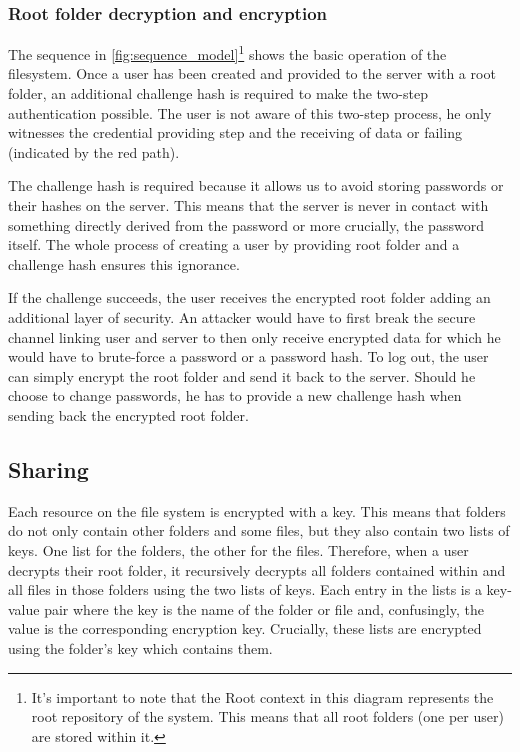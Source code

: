 \subsubsection{Root folder decryption and encryption}
The sequence in \autoref{fig:sequence_model}\footnote{It's important to note that the Root context in this diagram represents the root repository of the system. This means that all root folders (one per user) are stored within it.} shows the basic operation of the filesystem. Once a user has been created and provided to the server with a root folder, an additional challenge hash is required to make the two-step authentication possible. The user is not aware of this two-step process, he only witnesses the credential providing step and the receiving of data or failing (indicated by the red path).

The challenge hash is required because it allows us to avoid storing passwords or their hashes on the server. This means that the server is never in contact with something directly derived from the password or more crucially, the password itself. The whole process of creating a user by providing root folder and a challenge hash ensures this ignorance.

If the challenge succeeds, the user receives the encrypted root folder adding an additional layer of security. An attacker would have to first break the secure channel linking user and server to then only receive encrypted data for which he would have to brute-force a password or a password hash. To log out, the user can simply encrypt the root folder and send it back to the server. Should he choose to change passwords, he has to provide a new challenge hash when sending back the encrypted root folder. 

\subsection{Sharing}
Each resource on the file system is encrypted with a key. This means that folders do not only contain other folders and some files, but they also contain two lists of keys. One list for the folders, the other for the files. Therefore, when a user decrypts their root folder, it recursively decrypts all folders contained within and all files in those folders using the two lists of keys. Each entry in the lists is a key-value pair where the key is the name of the folder or file and, confusingly, the value is the corresponding encryption key. Crucially, these lists are encrypted using the folder's key which contains them. 

